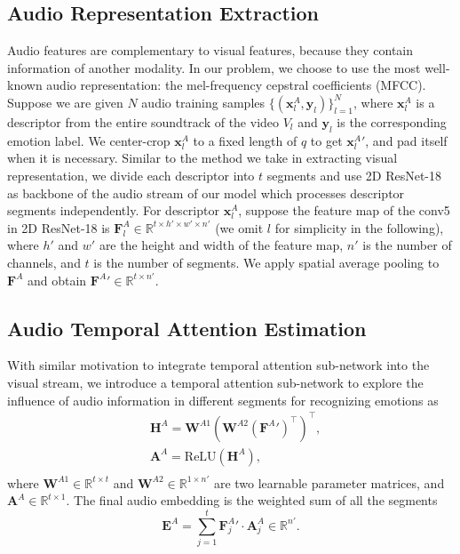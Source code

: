 \documentclass[letterpaper]{article} \usepackage{aaai20}  \usepackage{times}  \usepackage{helvet} \usepackage{courier}  \usepackage[hyphens]{url}  \usepackage{graphicx} \urlstyle{rm} \def\UrlFont{\rm}  \usepackage{graphicx}
\begin{document}
\subsection{Audio Representation Extraction}
Audio features are complementary to visual features, because they contain information of another modality. In our problem, we choose to use the most well-known audio representation: the mel-frequency cepstral coefficients (MFCC). Suppose we are given $N$ audio training samples $\{(\textbf{x}_l^{A},\textbf{y}_l)\}_{l=1}^{N}$, where $\textbf{x}_l^{A}$ is a descriptor from the entire soundtrack of the video $V_l$ and $\textbf{y}_l$ is the corresponding emotion label. We center-crop $\textbf{x}_l^{A}$ to a fixed length of $q$ to get ${\textbf{x}_l^{A}}'$, and pad itself when it is necessary. Similar to the method we take in extracting visual representation, we divide each descriptor into $t$ segments and use 2D ResNet-18 ~\cite{he2016deep} as backbone of the audio stream of our model which processes descriptor segments independently. For descriptor $\textbf{x}_l^{A}$, suppose the feature map of the conv5 in 2D ResNet-18 is $\textbf{F}_l^{A}\in \mathbb{R}^{t\times h'\times w' \times n'}$ (we omit $l$ for simplicity in the following), where $h'$ and $w'$ are the height and width of the feature map, $n'$ is the number of channels, and $t$ is the number of segments. We apply spatial average pooling to $\textbf{F}^{A}$ and obtain ${\textbf{F}^{A}}' \in \mathbb{R}^{t \times n'}$.

\subsection{Audio Temporal Attention Estimation}
With similar motivation to integrate temporal attention sub-network into the visual stream, we introduce a temporal attention sub-network to explore the influence of audio information in different segments for recognizing emotions as
\begin{equation}\begin{aligned}
&{{\textbf{H}^A}} = {\textbf{W}^{A1}}{({{\textbf{W}^{A2}}}{{({\textbf{F}^A}')}^ \top})^ \top },\\
&{\textbf{A}^A}=\text{ReLU}({\textbf{H}^A}),\\
\end{aligned}
\end{equation}
where ${\textbf{W}^{A1}}\in\mathbb{R}^{t\times t}$ and ${\textbf{W}^{A2}}\in\mathbb{R}^{1\times n'}$ are two learnable parameter matrices, and ${\textbf{A}^A} \in \mathbb{R}^{ t \times 1}$. The final audio embedding is the weighted sum of all the segments
\begin{equation}{\textbf{E}^A} = \sum\limits_{j = 1}^t {{{{\textbf{F}_j^A}}'} \cdot {{\textbf{A}_j^A}}} \in \mathbb{R}^{n'}.
\end{equation}
\end{document}

